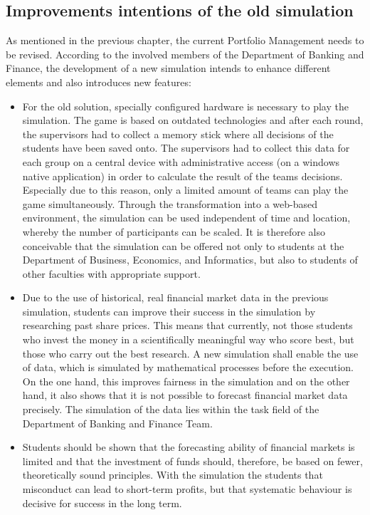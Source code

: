 \subsection{Improvements intentions of the old simulation}
As mentioned in the previous chapter, the current Portfolio Management needs to be revised. According to the involved members of the Department of Banking and Finance, the development of a new simulation intends to enhance different elements and also introduces new features:
\begin{itemize}
  \item For the old solution, specially configured hardware is necessary to play the simulation. The game is based on outdated technologies and after each round, the supervisors had to collect a memory stick where all decisions of the students have been saved onto. The supervisors had to collect this data for each group on a central device with administrative access (on a windows native application) in order to calculate the result of the teams decisions. Especially due to this reason, only a limited amount of teams can play the game simultaneously. Through the transformation into a web-based environment, the simulation can be used independent of time and location, whereby the number of participants can be scaled. It is therefore also conceivable that the simulation can be offered not only to students at the Department of Business, Economics, and Informatics, but also to students of other faculties with appropriate support.
  \item Due to the use of historical, real financial market data in the previous simulation, students can improve their success in the simulation by researching past share prices. This means that currently, not those students who invest the money in a scientifically meaningful way who score best, but those who carry out the best research. A new simulation shall enable the use of data, which is simulated by mathematical processes before the execution. On the one hand, this improves fairness in the simulation and on the other hand, it also shows that it is not possible to forecast financial market data precisely. The simulation of the data lies within the task field of the Department of Banking and Finance Team.
  \item Students should be shown that the forecasting ability of financial markets is limited and that the investment of funds should, therefore, be based on fewer, theoretically sound principles. With the simulation the students that misconduct can lead to short-term profits, but that systematic behaviour is decisive for success in the long term.
\end{itemize}

